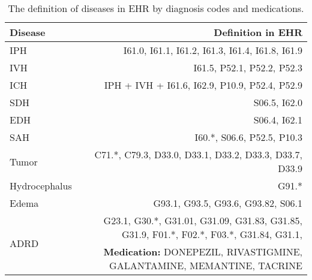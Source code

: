 \begin{table}[!htpb]
    \centering
    \caption{The definition of diseases in EHR by diagnosis codes and medications.}
    \begin{tabular}{lr}
    \toprule
         Disease &  Definition in EHR \\
    \midrule
       IPH  &  I61.0, I61.1, I61.2, I61.3, I61.4, I61.8, I61.9 \\
       IVH  &  I61.5, P52.1, P52.2, P52.3  \\
       ICH  &  IPH + IVH + I61.6, I62.9, P10.9, P52.4, P52.9 \\
       SDH  &  S06.5, I62.0 \\
       EDH  &  S06.4, I62.1 \\
       SAH  &  I60.*, S06.6, P52.5, P10.3  \\
       Tumor  &  C71.*, C79.3, D33.0, D33.1, D33.2, D33.3, D33.7, D33.9  \\
       Hydrocephalus  &  G91.* \\
       Edema  &  G93.1, G93.5, G93.6, G93.82, S06.1 \\
       \multirow{2}{*}{ADRD}  &  G23.1, G30.*, G31.01, G31.09, G31.83, G31.85, G31.9, F01.*, F02.*, F03.*, G31.84, G31.1, \\ 
       & \textbf{Medication:} DONEPEZIL, RIVASTIGMINE, GALANTAMINE, MEMANTINE, TACRINE \\ 
    \bottomrule
    \end{tabular}
    \label{tab:disease_definition}
\end{table}
